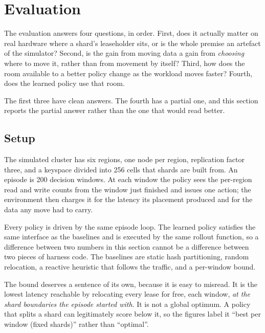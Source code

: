 
\section{Evaluation}

The evaluation answers four questions, in order. First, does it actually
matter on real hardware where a shard's leaseholder sits, or is the whole
premise an artefact of the simulator? Second, is the gain from moving data
a gain from \emph{choosing} where to move it, rather than from movement by
itself? Third, how does the room available to a better policy change as the
workload moves faster? Fourth, does the learned policy use that room.

The first three have clean answers. The fourth has a partial one, and this
section reports the partial answer rather than the one that would read
better.

\subsection{Setup}

The simulated cluster has six regions, one node per region, replication
factor three, and a keyspace divided into 256 cells that shards are built
from. An episode is 200 decision windows. At each window the policy sees
the per-region read and write counts from the window just finished and
issues one action; the environment then charges it for the latency its
placement produced and for the data any move had to carry.

Every policy is driven by the same episode loop. The learned policy
satisfies the same interface as the baselines and is executed by the same
rollout function, so a difference between two numbers in this section
cannot be a difference between two pieces of harness code. The baselines
are static hash partitioning, random relocation, a reactive heuristic that
follows the traffic, and a per-window bound.

The bound deserves a sentence of its own, because it is easy to misread. It
is the lowest latency reachable by relocating every lease for free, each
window, \emph{at the shard boundaries the episode started with}. It is not
a global optimum. A policy that splits a shard can legitimately score below
it, so the figures label it ``best per window (fixed shards)'' rather than
``optimal''.

